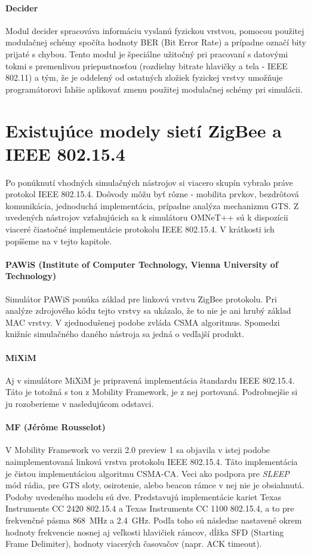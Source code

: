 \paragraph{Decider}
\indent Modul decider spracováva informáciu vyslanú fyzickou vrstvou, pomocou použitej modulačnej schémy spočíta hodnoty BER (Bit Error Rate) a prípadne označí bity prijaté s chybou. Tento modul je špeciálne užitočný pri pracovaní s datovými tokmi s premenlivou priepustnosťou (rozdielny bitrate hlavičky a tela - IEEE 802.11) a tým, že je oddelený od ostatných zložiek fyzickej vrstvy umožňuje programátorovi ľahšie aplikovať zmenu použitej modulačnej schémy pri simulácii.\\

\section{Existujúce modely sietí ZigBee a IEEE 802.15.4}
\indent\indent Po ponúknutí vhodných simulačných nástrojov si viacero skupín vybralo práve protokol IEEE 802.15.4. Doôvody môžu byť rôzne - mobilita prvkov, bezdrôtová komunikácia, jednoduchá implementácia, prípadne analýza mechanizmu GTS. Z uvedených nástrojov vzťahujúcich sa k simulátoru OMNeT++ sú k dispozícii viaceré čiastočné implementácie protokolu IEEE 802.15.4. V krátkosti ich popíšeme na v tejto kapitole.\\

\paragraph{PAWiS (Institute of Computer Technology, Vienna University of Technology)}
\indent Simulátor PAWiS ponúka základ pre linkovú vrstvu ZigBee protokolu. Pri analýze zdrojového kódu tejto vrstvy sa ukázalo, že to nie je ani hrubý základ MAC vrstvy. V zjednodušenej podobe zvláda CSMA algoritmus. Spomedzi knižníc simulačného daného nástroja sa jedná o vedľajší produkt.

\paragraph{MiXiM}
\indent Aj v simulátore MiXiM je pripravená implementácia štandardu IEEE 802.15.4. Táto je totožná s tou z Mobility Framework, je z nej portovaná. Podrobnejšie si ju rozoberieme v nasledujúcom odstavci.

\paragraph{MF (Jérôme Rousselot)}
\indent V Mobility Framework vo verzii 2.0 preview 1 sa objavila v istej podobe naimplementovaná linková vrstva protokolu IEEE 802.15.4. Táto implementácia je čistou implementáciou algoritmu CSMA-CA. Veci ako podpora pre \textit{SLEEP} mód rádia, pre GTS sloty, osirotenie, alebo beacon rámce v nej nie je obsiahnutá. Podoby uvedeného modelu sú dve. Predstavujú implementácie kariet Texas Instruments CC 2420 802.15.4 a Texas Instruments CC 1100 802.15.4, a to pre frekvenčné pásma 868~MHz a 2.4~GHz. Podľa toho sú následne nastavené okrem hodnoty frekvencie nosnej aj veľkosti hlavičiek rámcov, dĺžka SFD (Starting Frame Delimiter), hodnoty viacerých časovačov (napr. ACK timeout).

